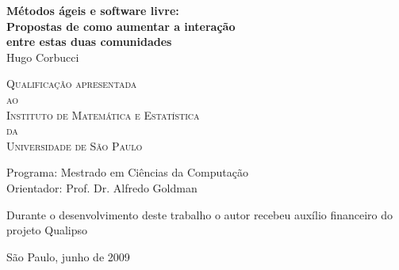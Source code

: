 \documentclass[12pt,twoside,letterpaper]{book}
\begin{document}
\frontmatter \onehalfspacing %

\thispagestyle{empty}
\begin{center}
  \vspace*{2.3cm}
  \textbf{\Large{Métodos ágeis e software livre:\\
      Propostas de como aumentar a interação\\
      entre estas duas comunidades}}\\
	
  \vspace*{1.2cm} \Large{Hugo Corbucci}
    
  \vskip 2cm \textsc{
    Qualificação apresentada\\[-0.25cm]
    ao\\[-0.25cm]
    Instituto de Matemática e Estatística\\[-0.25cm]
    da\\[-0.25cm]
    Universidade de São Paulo}
    
  \vskip 1.5cm
  Programa: Mestrado em Ciências da Computação\\
  Orientador: Prof. Dr. Alfredo Goldman

  \vskip 1cm \normalsize{Durante o desenvolvimento deste trabalho o
    autor recebeu auxílio financeiro do projeto Qualipso}
	
  \vskip 0.5cm \normalsize{São Paulo, junho de 2009}
\end{center}

%
%
%
%
%	
%	  
\end{document}
